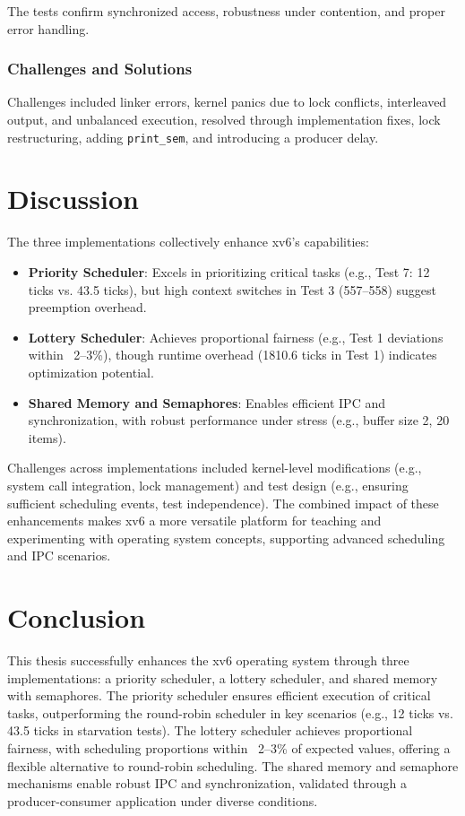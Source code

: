 \documentclass[12pt]{article}
\begin{document}
The tests confirm synchronized access, robustness under contention, and proper error handling.

\subsubsection{Challenges and Solutions}
\label{subsubsec:semaphore-challenges}

Challenges included linker errors, kernel panics due to lock conflicts, interleaved output, and unbalanced execution, resolved through implementation fixes, lock restructuring, adding \texttt{print\_sem}, and introducing a producer delay.

\section{Discussion}
\label{sec:discussion}

The three implementations collectively enhance xv6’s capabilities:

\begin{itemize}
  \item \textbf{Priority Scheduler}: Excels in prioritizing critical tasks (e.g., Test 7: 12 ticks vs. 43.5 ticks), but high context switches in Test 3 (557–558) suggest preemption overhead.
  \item \textbf{Lottery Scheduler}: Achieves proportional fairness (e.g., Test 1 deviations within ~2–3\%), though runtime overhead (1810.6 ticks in Test 1) indicates optimization potential.
  \item \textbf{Shared Memory and Semaphores}: Enables efficient IPC and synchronization, with robust performance under stress (e.g., buffer size 2, 20 items).
\end{itemize}

Challenges across implementations included kernel-level modifications (e.g., system call integration, lock management) and test design (e.g., ensuring sufficient scheduling events, test independence). The combined impact of these enhancements makes xv6 a more versatile platform for teaching and experimenting with operating system concepts, supporting advanced scheduling and IPC scenarios.

\section{Conclusion}
\label{sec:conclusion}

This thesis successfully enhances the xv6 operating system through three implementations: a priority scheduler, a lottery scheduler, and shared memory with semaphores. The priority scheduler ensures efficient execution of critical tasks, outperforming the round-robin scheduler in key scenarios (e.g., 12 ticks vs. 43.5 ticks in starvation tests). The lottery scheduler achieves proportional fairness, with scheduling proportions within ~2–3\% of expected values, offering a flexible alternative to round-robin scheduling. The shared memory and semaphore mechanisms enable robust IPC and synchronization, validated through a producer-consumer application under diverse conditions.
\end{document}
